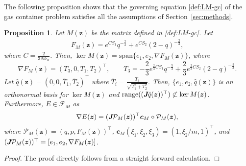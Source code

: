 \documentclass[openacc]{rsproca_new}%
\newcommand{\z}{\bm{z}}
\newtheorem{proposition}{Proposition}
\begin{document}
The following proposition
shows that 
the governing equation \eqref{def:LM-gc} 
of the gas container problem 
satisfies all the assumptions of Section~\ref{sec:methods}.
\begin{proposition} \label{prop:gas}
    Let $M(\z)$ be the matrix 
    defined in \eqref{def:LM-gc}.
    Let 
    \begin{align*}
        F_M(\z) = e^{CS_1}q^{-\frac{2}{3}}
        +
        e^{CS_2}(2-q)^{-\frac{2}{3}},
    \end{align*}
    where $C = \frac{2}{3Nk_B}$.
    Then, $\ker M(\z) = \text{span}\{e_1, e_2, \nabla F_M(\z)\}$, where
    \begin{equation*}
        \nabla F_M(\z) =
        (T_3, 0, T_1, T_2)^\top,
        \qquad
        T_3 = 
        -\frac{2}{3}e^{\frac{2}{3}CS_1}q^{-\frac{5}{3}}
        +\frac{2}{3}e^{\frac{2}{3}CS_2}(2-q)^{-\frac{5}{3}}.
    \end{equation*}
    Let $\hat{q}(\z) = (0, 0, \bar{T}_1, \bar{T}_2)^\top$
    where 
    $\bar{T}_i = \frac{T_i}{\sqrt{T_1^2+T_2^2}}$.
    Then, 
    $\{e_1,e_2,\hat{q}(\z)\}$ is an orthonormal basis for $\ker M(\z)$
    and $\text{range}((\emph{\textbf{J}}\hat{q}(\z))^\top) \not\subset \ker M(\z)$.
    Furthermore, $E \in \mathcal{F}_M$ as 
    \begin{equation*}
        \nabla E(\z) = (\emph{\textbf{J}}\mathcal{P}_M(\z))^\top \bm{c}_{M} \circ \mathcal{P}_M(\z),
    \end{equation*}
    where 
    $\mathcal{P}_M(\z) = (q, p, F_M(\z))^\top$, 
    $\bm{c}_M(\xi_1,\xi_2,\xi_3) = (1, \xi_2/m, 1)^\top$,
    and 
    $(\emph{\textbf{J}}\mathcal{P}_M(\z))^\top = [e_1, e_2, \nabla F_M(\z)]$.
\end{proposition}
\begin{proof}
    The proof directly follows from a straight forward calculation.
\end{proof}
\end{document}
